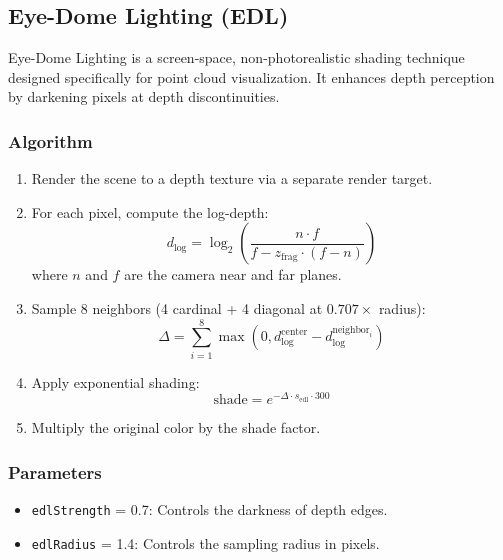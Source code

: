 \documentclass[11pt, letterpaper]{article}
\begin{document}
\subsection{Eye-Dome Lighting (EDL)}
\label{sec:edl}

Eye-Dome Lighting is a screen-space, non-photorealistic shading technique designed specifically for point cloud visualization. It enhances depth perception by darkening pixels at depth discontinuities.

\subsubsection{Algorithm}

\begin{enumerate}
    \item Render the scene to a depth texture via a separate render target.
    \item For each pixel, compute the log-depth:
    \begin{equation}
        d_{\log} = \log_2\left(\frac{n \cdot f}{f - z_{\text{frag}} \cdot (f - n)}\right)
    \end{equation}
    where $n$ and $f$ are the camera near and far planes.
    \item Sample 8 neighbors (4 cardinal + 4 diagonal at $0.707\times$ radius):
    \begin{equation}
        \Delta = \sum_{i=1}^{8} \max\left(0, d_{\log}^{\text{center}} - d_{\log}^{\text{neighbor}_i}\right)
    \end{equation}
    \item Apply exponential shading:
    \begin{equation}
        \text{shade} = e^{-\Delta \cdot s_{\text{edl}} \cdot 300}
    \end{equation}
    \item Multiply the original color by the shade factor.
\end{enumerate}

\subsubsection{Parameters}
\begin{itemize}
    \item \texttt{edlStrength} = 0.7: Controls the darkness of depth edges.
    \item \texttt{edlRadius} = 1.4: Controls the sampling radius in pixels.
\end{itemize}
\end{document}
